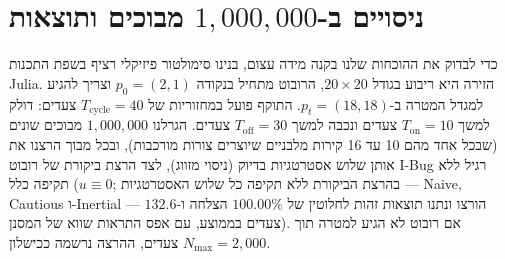 \documentclass[11pt, a4paper]{article}
\begin{document}
\section{ניסויים ב-$1,000,000$ מבוכים ותוצאות}
כדי לבדוק את ההוכחות שלנו בקנה מידה עצום, בנינו סימולטור פיזיקלי רציף בשפת התכנות \foreignlanguage{english}{Julia}. הזירה היא ריבוע בגודל $20 \times 20$, הרובוט מתחיל בנקודה $p_0 = (2, 1)$ וצריך להגיע למגדל המטרה ב-$p_t = (18, 18)$. התוקף פועל במחזוריות של $T_{\text{cycle}} = 40$ צעדים: דולק למשך $T_{\text{on}} = 10$ צעדים ונכבה למשך $T_{\text{off}} = 30$ צעדים. הגרלנו $1,000,000$ מבוכים שונים (שבכל אחד מהם 10 עד 16 קירות מלבניים שיוצרים צורות מורכבות), ובכל מבוך הרצנו את אותן שלוש אסטרטגיות בדיוק (ניסוי מזווג), לצד הרצת ביקורת של רובוט \foreignlanguage{english}{I-Bug} רגיל ללא תקיפה כלל ($u \equiv 0$; בהרצת הביקורת ללא תקיפה כל שלוש האסטרטגיות — \foreignlanguage{english}{Naive}, \foreignlanguage{english}{Cautious} ו-\foreignlanguage{english}{Inertial} — הורצו ונתנו תוצאות זהות לחלוטין של $100.00\%$ הצלחה ו-$132.6$ צעדים בממוצע, עם אפס התראות שווא של המסנן). אם רובוט לא הגיע למטרה תוך $N_{\max} = 2,000$ צעדים, ההרצה נרשמה ככישלון.

\begin{table}[htbp]
\centering
\small
\caption{השוואת ביצועים על פני $1,000,000$ מבוכים אקראיים}
\label{tab:results}
\end{table}
\end{document}

